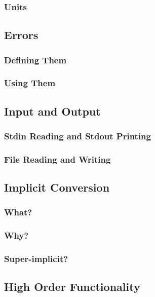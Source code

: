 \documentclass{article}
\begin{document}

\subsubsection{Units}


\subsection{Errors}
\subsubsection{Defining Them}

\subsubsection{Using Them}

\subsection{Input and Output}
\subsubsection{Stdin Reading and Stdout Printing}

\subsubsection{File Reading and Writing}

\subsection{Implicit Conversion}
\subsubsection{What?}

\subsubsection{Why?}

\subsubsection{Super-implicit?}

\subsection{High Order Functionality}
\end{document}
